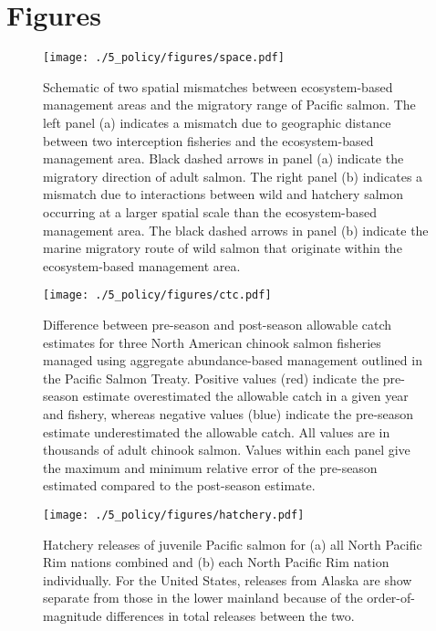 \section{Figures}

\begin{figure}[htbp]
  \centering \texttt{[image: ./5\_policy/figures/space.pdf]}
  \caption[Schematic of two spatial mismatches between ecosystem-based
           management areas and the migratory range of Pacific
           salmon.]{Schematic of two spatial mismatches between ecosystem-based
           management areas and the migratory range of Pacific salmon. The left
           panel (a) indicates a mismatch due to geographic distance between two
           interception fisheries and the ecosystem-based management area. Black
           dashed arrows in panel (a) indicate the migratory direction of adult
           salmon. The right panel (b) indicates a mismatch due to interactions
           between wild and hatchery salmon occurring at a larger spatial scale
           than the ecosystem-based management area. The black dashed arrows in
           panel (b) indicate the marine migratory route of wild salmon that
           originate within the ecosystem-based management area.}
  \label{fig:ebm:1}
\end{figure}


\begin{figure}[htbp]
  \centering \texttt{[image: ./5\_policy/figures/ctc.pdf]}
  \caption[Difference between pre-season and post-season allowable catch
           estimates for three North American chinook salmon
           fisheries.]{Difference between pre-season and post-season allowable
           catch estimates for three North American chinook salmon fisheries
           managed using aggregate abundance-based management outlined in the
           Pacific Salmon Treaty. Positive values (red) indicate the pre-season
           estimate overestimated the allowable catch in a given year and
           fishery, whereas negative values (blue) indicate the pre-season
           estimate underestimated the allowable catch. All values are in
           thousands of adult chinook salmon. Values within each panel give the
           maximum and minimum relative error of the pre-season estimated
           compared to the post-season estimate.}
  \label{fig:ebm:2}
\end{figure}


\begin{figure}[htbp]
  \centering \texttt{[image: ./5\_policy/figures/hatchery.pdf]}
  \caption[Hatchery releases of juvenile Pacific salmon from North Pacific Rim
           nations.]{Hatchery releases of juvenile Pacific salmon for (a) all
           North Pacific Rim nations combined and (b) each North Pacific Rim
           nation individually. For the United States, releases from Alaska are
           show separate from those in the lower mainland because of the
           order-of-magnitude differences in total releases between the two.}
  \label{fig:ebm:3}
\end{figure}


